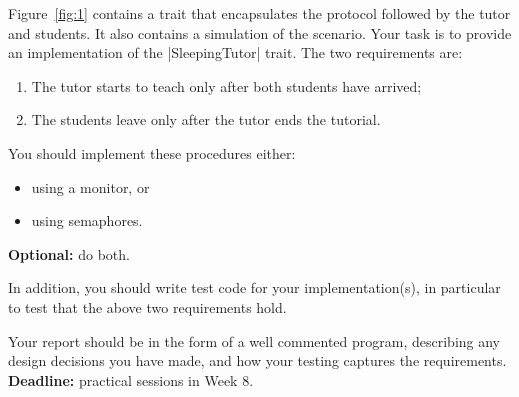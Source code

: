 \documentclass[12pt,a4paper]{article}
\begin{document}

Figure~\ref{fig:1} contains a trait that encapsulates the protocol followed by
the tutor and students.  It also contains a simulation of the scenario.
Your task is to provide an implementation of the |SleepingTutor| trait.
%
The two requirements are:
%
\begin{enumerate}
\item
The tutor starts to teach only after both students have arrived;

\item
The students leave only after the tutor ends the tutorial.
\end{enumerate}
%
You should implement these procedures either:
\begin{itemize}
\item
using a monitor, or

\item
using semaphores.
\end{itemize}
%
\textbf{Optional:} do both.  

In addition, you should write test code for your implementation(s), in
particular to test that the above two requirements hold. 

Your report should be in the form of a well commented program, describing any
design decisions you have made, and how your testing captures the
requirements.  \textbf{Deadline:} practical sessions in Week 8.
\end{document}
